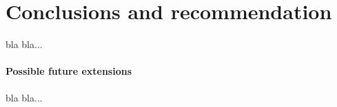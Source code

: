 \chapter{Conclusions and recommendation}


bla bla...

\subsubsection{Possible future extensions}

bla bla...